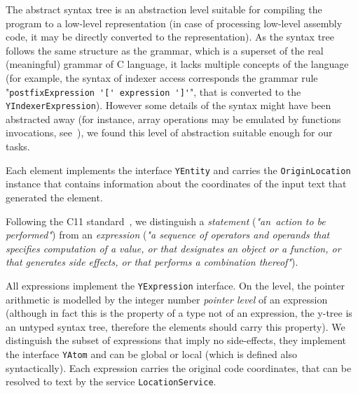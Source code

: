 The abstract syntax tree \ytree{} is an abstraction level suitable for compiling the program to a low-level representation (in case of processing low-level assembly code, it may be directly converted to the \xgraph{} representation).
As the  syntax tree follows the same structure as the grammar, which is a superset of the real (meaningful) grammar of C language, it lacks multiple concepts of the language (for example, the syntax of indexer access corresponds the grammar rule "\lstinline{postfixExpression '[' expression ']'}", that is converted to the \texttt{YIndexerExpression}).
However some details of the syntax might have been abstracted away (for instance, array operations may be emulated by functions invocations, see~\cite[Chapter 5]{gries2012science}), we found this level of abstraction suitable enough for our tasks.

Each \ytree{} element implements the interface \texttt{YEntity} and carries the \texttt{OriginLocation} %
instance that contains information about the coordinates of the input text that generated the \ytree{} element.

Following the C11 standard~\cite{iso2012iec}, we distinguish a \textit{statement} (\textit{"an~action to be performed"}) from an \textit{expression} (\textit{"a sequence of operators and operands that specifies computation of a value, or that designates an object or a function, or that generates side effects, or that performs a combination thereof"}).

All \ytree{} expressions implement the \texttt{YExpression} interface.
On the \ytree{} level, the pointer arithmetic is modelled by the integer number \textit{pointer level} of an expression (although in fact this is the property of a type not of an expression, the y-tree is an untyped syntax tree, therefore the elements \ytree{} should carry this property).
We distinguish the subset of expressions that imply no side-effects, they implement the interface \texttt{YAtom} and can be global or local (which is defined also syntactically).
Each \ytree{} expression carries the original code coordinates, that can be resolved to text by the service \texttt{LocationService}. %

